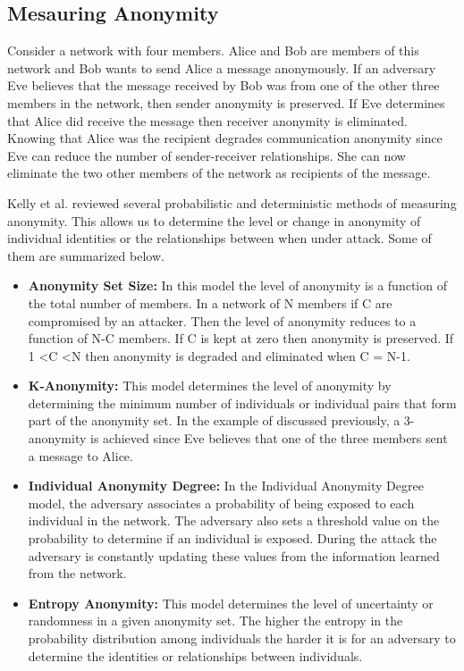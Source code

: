 \documentclass{llncs}
\begin{document}
\subsection{Mesauring Anonymity}
Consider a network with four members. Alice and Bob are members of this network and Bob wants to send Alice a message anonymously. If an adversary Eve believes that the message received by Bob was from one of the other three members in the network, then sender anonymity is preserved. If Eve determines that Alice did receive the message then receiver anonymity is eliminated. Knowing that Alice was the recipient degrades communication anonymity since Eve can reduce the number of sender-receiver relationships. She can now eliminate the two other members of the network as recipients of the message.

Kelly et al. \cite{kelly2012exploring} reviewed several probabilistic and deterministic methods of measuring anonymity. This allows us to determine the level or change in anonymity of individual identities or the relationships between when under attack. Some of them are summarized below. 
\begin{itemize}
	\item[]{\textbf{Anonymity Set Size:} In this model the level of anonymity is a function of the total number of members. In a network of N members if C are compromised by an attacker. Then the level of anonymity reduces to a function of N-C members. If C is kept at zero then anonymity is preserved. If 1 \textless C \textless N then anonymity is degraded and eliminated when C = N-1.}
	\item[]{\textbf{K-Anonymity:} This model determines the level of anonymity by determining the minimum number of individuals or individual pairs that form part of the anonymity set. In the example of discussed previously, a 3-anonymity is achieved since Eve believes that one of the three members sent a message to Alice.}
	\item[]{\textbf{Individual Anonymity Degree:} In the Individual Anonymity Degree model, the adversary associates a probability of being exposed to each individual in the network. The adversary also sets a threshold value on the probability to determine if an individual is exposed. During the attack the adversary is constantly updating these values from the information learned from the network.}
	\item[]{\textbf{Entropy Anonymity:} This model determines the level of uncertainty or randomness in a given anonymity set. The higher the entropy in the probability distribution among individuals the harder it is for an adversary to determine the identities or relationships between individuals.}
\end{itemize}
\end{document}
